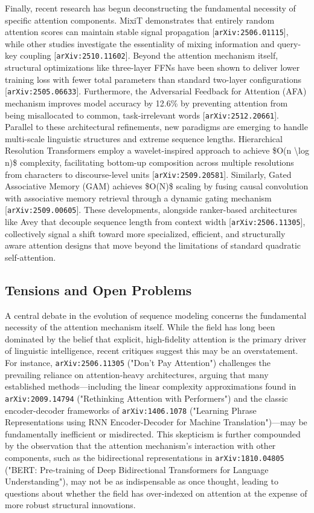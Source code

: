 \documentclass[11pt]{article}
\begin{document}
Finally, recent research has begun deconstructing the fundamental necessity of specific attention components. MixiT demonstrates that entirely random attention scores can maintain stable signal propagation [\texttt{arXiv:2506.01115}], while other studies investigate the essentiality of mixing information and query-key coupling [\texttt{arXiv:2510.11602}]. Beyond the attention mechanism itself, structural optimizations like three-layer FFNs have been shown to deliver lower training loss with fewer total parameters than standard two-layer configurations [\texttt{arXiv:2505.06633}]. Furthermore, the Adversarial Feedback for Attention (AFA) mechanism improves model accuracy by 12.6\% by preventing attention from being misallocated to common, task-irrelevant words [\texttt{arXiv:2512.20661}]. Parallel to these architectural refinements, new paradigms are emerging to handle multi-scale linguistic structures and extreme sequence lengths. Hierarchical Resolution Transformers employ a wavelet-inspired approach to achieve \$O(n \textbackslash{}log n)\$ complexity, facilitating bottom-up composition across multiple resolutions from characters to discourse-level units [\texttt{arXiv:2509.20581}]. Similarly, Gated Associative Memory (GAM) achieves \$O(N)\$ scaling by fusing causal convolution with associative memory retrieval through a dynamic gating mechanism [\texttt{arXiv:2509.00605}]. These developments, alongside ranker-based architectures like Avey that decouple sequence length from context width [\texttt{arXiv:2506.11305}], collectively signal a shift toward more specialized, efficient, and structurally aware attention designs that move beyond the limitations of standard quadratic self-attention.

\subsection{Tensions and Open Problems}

A central debate in the evolution of sequence modeling concerns the fundamental necessity of the attention mechanism itself. While the field has long been dominated by the belief that explicit, high-fidelity attention is the primary driver of linguistic intelligence, recent critiques suggest this may be an overstatement. For instance, \texttt{arXiv:2506.11305} ("Don't Pay Attention") challenges the prevailing reliance on attention-heavy architectures, arguing that many established methods—including the linear complexity approximations found in \texttt{arXiv:2009.14794} ("Rethinking Attention with Performers") and the classic encoder-decoder frameworks of \texttt{arXiv:1406.1078} ("Learning Phrase Representations using RNN Encoder-Decoder for Machine Translation")—may be fundamentally inefficient or misdirected. This skepticism is further compounded by the observation that the attention mechanism's interaction with other components, such as the bidirectional representations in \texttt{arXiv:1810.04805} ("BERT: Pre-training of Deep Bidirectional Transformers for Language Understanding"), may not be as indispensable as once thought, leading to questions about whether the field has over-indexed on attention at the expense of more robust structural innovations.
\end{document}
